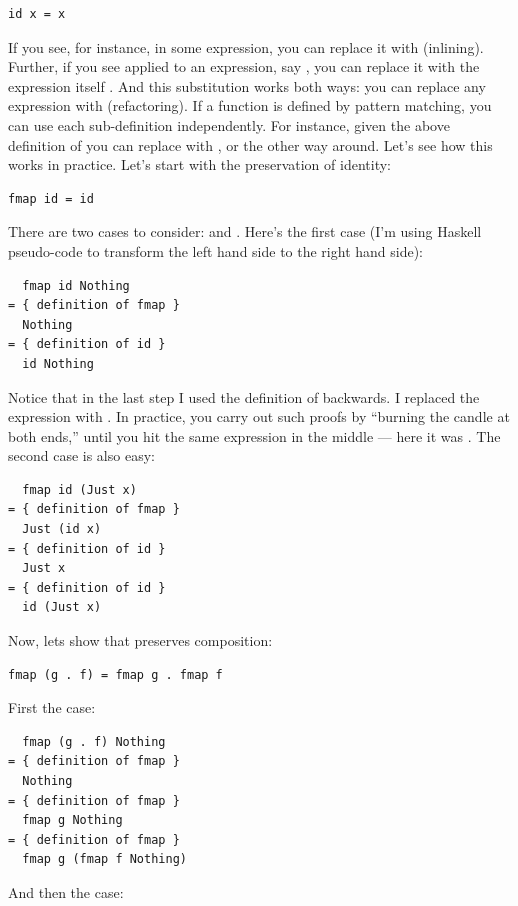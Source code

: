 \begin{Verbatim}
id x = x
\end{Verbatim}
If you see, for instance,  in some expression, you can
replace it with  (inlining). Further, if you see 
applied to an expression, say , you can replace it
with the expression itself . And this substitution
works both ways: you can replace any expression  with
 (refactoring). If a function is defined by pattern
matching, you can use each sub-definition independently. For instance,
given the above definition of  you can replace
 with , or the other way
around. Let's see how this works in practice. Let's start with the
preservation of identity:

\begin{Verbatim}
fmap id = id
\end{Verbatim}
There are two cases to consider:  and .
Here's the first case (I'm using Haskell pseudo-code to transform the
left hand side to the right hand side):

\begin{Verbatim}
  fmap id Nothing
= { definition of fmap }
  Nothing
= { definition of id } 
  id Nothing
\end{Verbatim}
Notice that in the last step I used the definition of 
backwards. I replaced the expression  with
. In practice, you carry out such proofs by
``burning the candle at both ends,'' until you hit the same expression
in the middle --- here it was . The second case is also
easy:

\begin{Verbatim}
  fmap id (Just x)
= { definition of fmap }
  Just (id x)
= { definition of id }
  Just x
= { definition of id }
  id (Just x)
\end{Verbatim}
Now, lets show that  preserves composition:

\begin{Verbatim}
fmap (g . f) = fmap g . fmap f
\end{Verbatim}
First the  case:

\begin{Verbatim}
  fmap (g . f) Nothing
= { definition of fmap }
  Nothing
= { definition of fmap }
  fmap g Nothing
= { definition of fmap }
  fmap g (fmap f Nothing)
\end{Verbatim}
And then the  case:

